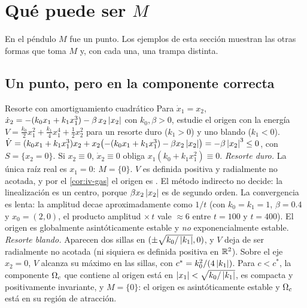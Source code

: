 \section{Qué puede ser $M$}
\label{sec:iv-ejemplos}

En el péndulo $M$ fue un punto. Los ejemplos de esta sección muestran las otras formas que toma $M$ y, con cada una, una trampa distinta.

\subsection{Un punto, pero en la componente correcta}

\begin{ejemplo}[label=ej:iv-duffing]{Resorte con amortiguamiento cuadrático \citep[Ej.~2.35]{KeBr23}}
Para $\dot x_1=x_2$, $\dot x_2=-(k_0x_1+k_1x_1^3)-\beta\,x_2\left\lvert x_2\right\rvert$ con $k_0,\beta>0$, estudie el origen con la energía $V=\tfrac{k_0}2x_1^2+\tfrac{k_1}4x_1^4+\tfrac12x_2^2$ para un resorte duro ($k_1>0$) y uno blando ($k_1<0$).
\solucion $\dot V=(k_0x_1+k_1x_1^3)x_2+x_2\bigl(-(k_0x_1+k_1x_1^3)-\beta x_2\left\lvert x_2\right\rvert\bigr)=-\beta\left\lvert x_2\right\rvert^3\le0$, con $S=\{x_2=0\}$. Si $x_2\equiv0$, $\dot x_2\equiv0$ obliga $x_1(k_0+k_1x_1^2)\equiv0$.
\emph{Resorte duro.} La única raíz real es $x_1=0$: $M=\{0\}$. $V$ es definida positiva y radialmente no acotada, y por el \cref{cor:iv-gas} el origen es . El método indirecto no decide: la linealización es un centro, porque $\beta x_2\left\lvert x_2\right\rvert$ es de segundo orden. La convergencia es lenta: la amplitud decae aproximadamente como $1/t$ (con $k_0=k_1=1$, $\beta=0.4$ y $x_0=(2,0)$, el producto amplitud $\times\,t$ vale $\approx6$ entre $t=100$ y $t=400$). El origen es globalmente asintóticamente estable y \emph{no} exponencialmente estable.
\emph{Resorte blando.} Aparecen dos sillas en $(\pm\sqrt{k_0/\left\lvert k_1\right\rvert},0)$, y $V$ deja de ser radialmente no acotada (ni siquiera es definida positiva en $\mathbb{R}^2$). Sobre el eje $x_2=0$, $V$ alcanza su máximo en las sillas, con $c^*=k_0^2/(4\left\lvert k_1\right\rvert)$. Para $c<c^*$, la componente $\Omega_{c}$ que contiene al origen está en $\left\lvert x_1\right\rvert<\sqrt{k_0/\left\lvert k_1\right\rvert}$, es compacta y positivamente invariante, y $M=\{0\}$: el origen es  asintóticamente estable y $\Omega_{c}$ está en su región de atracción.
\end{ejemplo}

